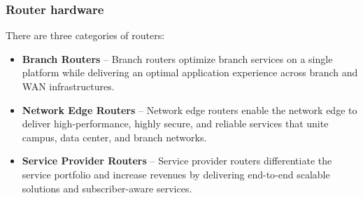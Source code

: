 \subsubsection{Router hardware}
There are three categories of routers:
\begin{itemize}
\item \textbf{Branch Routers} -- Branch routers optimize branch services on a single platform while delivering an optimal application experience across branch and WAN infrastructures.
\item \textbf{Network Edge Routers} -- Network edge routers enable the network edge to deliver high-performance, highly secure, and reliable services that unite campus, data center, and branch networks.
\item \textbf{Service Provider Routers} -- Service provider routers differentiate the service portfolio and increase revenues by delivering end-to-end scalable solutions and subscriber-aware services.
\end{itemize}
